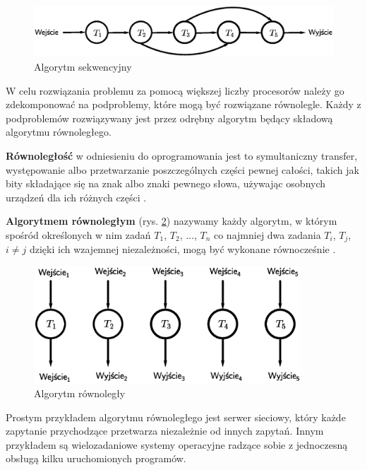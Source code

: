 \begin{figure}[h]
\centering
\includegraphics[width=14cm]{images/Rys2.eps}
\caption{Algorytm sekwencyjny}
\label{fig:sequential}
\end{figure}

W celu rozwiązania problemu za pomocą większej liczby procesorów należy go zdekomponować na podproblemy, które mogą być rozwiązane równolegle. Każdy z podproblemów rozwiązywany jest przez odrębny algorytm będący składową algorytmu równoległego.


\begin{definicja}[Równoległość]\label{def:rownoleglosc}
\textbf{Równoległość} w odniesieniu do oprogramowania jest to symultaniczny transfer, występowanie albo przetwarzanie poszczególnych części pewnej całości, takich jak bity składające się na znak albo znaki pewnego słowa, używając osobnych urządzeń dla ich różnych części \cite{IEEE}.
\end{definicja}


\begin{definicja}\label{def:algorytm_rownolegly}
\textbf{Algorytmem równoległym} (rys. \ref{fig:parallel}) nazywamy każdy algorytm, w którym spośród określonych w nim zadań \(T_1\), \(T_2\), \(\dots\), \(T_n\) co najmniej dwa zadania \(T_i\), \(T_j\), \(i\neq j\) dzięki ich wzajemnej niezależności, mogą być wykonane równocześnie \cite{APC2011}.\\
\end{definicja}

\begin{figure}[h]
\centering
\includegraphics[width=10cm]{images/Rys1.eps}
\caption{Algorytm równoległy}
\label{fig:parallel}
\end{figure}

\begin{przyklad}
Prostym przykładem algorytmu równoległego jest serwer sieciowy, który każde zapytanie przychodzące przetwarza niezależnie od innych zapytań. Innym przykładem są wielozadaniowe systemy operacyjne radzące sobie z jednoczesną obsługą kilku uruchomionych programów.
\end{przyklad}

